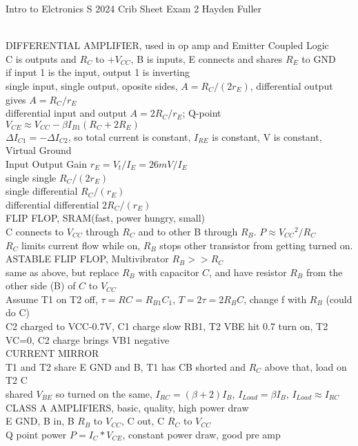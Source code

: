 \documentclass{article}
\begin{document}
Intro to Elctronics S 2024 Crib Sheet Exam 2 Hayden Fuller\begin{large}
\\DIFFERENTIAL AMPLIFIER, used in op amp and Emitter Coupled Logic
\\C is outputs and $R_C$ to $+V_{CC}$,  B is inputs,  E connects and shares $R_E$ to GND
\\if input 1 is the input, output 1 is inverting
\\single input, single output, oposite sides, $A=R_C/(2 r_E)$, differential output gives $A=R_C/r_E$
\\differential input and output $A=2R_C/r_E$; Q-point $V_{CE}\approx V_{CC}-\beta I_{B1} (R_C+2R_E)$
\\$\Delta I_{C1} = -\Delta I_{C2}$, so total current is constant, $I_{RE}$ is constant, V is constant, Virtual Ground
\\Input Output Gain   $r_E=V_t/I_E=26mV/I_E$
\\single single $R_C/(2r_E)$
\\single differential $R_C/(r_E)$
\\differential differential $2R_C/(r_E)$
\\FLIP FLOP, SRAM(fast, power hungry, small)
\\C connects to $V_{CC}$ through $R_C$ and to other B through $R_B$.  $P\approx V_{CC}$$^2/R_C$
\\$R_C$ limits current flow while on, $R_B$ stops other transistor from getting turned on.
\\ASTABLE FLIP FLOP, Multivibrator $R_B>>R_C$
\\same as above, but replace $R_B$ with capacitor $C$, and have resistor $R_B$ from the other side (B) of $C$ to $V_{CC}$
\\Assume T1 on T2 off, $\tau=RC=R_{B1}C_1$, $T=2\tau=2R_BC$, change f with $R_B$ (could do C)
\\C2 charged to VCC-0.7V, C1 charge slow RB1, T2 VBE hit 0.7 turn on, T2 VC=0, C2 charge brings VB1 negative
\\CURRENT MIRROR
\\T1 and T2 share E GND and B, T1 has CB shorted and $R_C$ above that, load on T2 C 
\\shared $V_{BE}$ so turned on the same, $I_{RC}=(\beta+2)I_B$, $I_{Load}=\beta I_B$, $I_{Load}\approx I_{RC}$
\\CLASS A AMPLIFIERS, basic, quality, high power draw
\\E GND, B in, B $R_B$ to $V_{CC}$, C out, C $R_C$ to $V_{CC}$
\\Q point power $P=I_C * V_{CE}$, constant power draw, good pre amp
$$
\end{large}
\end{document}
